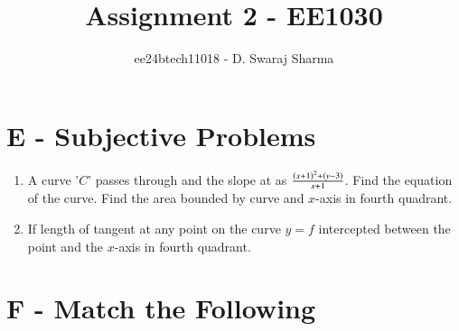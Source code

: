 \documentclass[journal]{IEEEtran}
\begin{document}

\vspace{3cm}

\title{Assignment 2 - EE1030}
\author{ee24btech11018 - D. Swaraj Sharma}

{\let\newpage\relax\maketitle}

\renewcommand{\thefigure}{\theenumi}
\renewcommand{\thetable}{\theenumi}
\setlength{\intextsep}{10pt}

\renewcommand{\thetable}{\theenumi}

\section{E - Subjective Problems}

\begin{enumerate}[label={\arabic*.}]

	\item A curve '$C$' passes through  and the slope at  as $\frac{\left(x+1\right)^2+\left(y-3\right)}{x+1}$. Find the equation of the curve. Find the area bounded by curve and $x$-axis in fourth quadrant.  
		
		\hfill{}
	
\item If length of tangent at any point on the curve $y=f$ intercepted between the point and the $x$-axis in fourth quadrant. 
	\hfill{}

\end{enumerate}

\section{F - Match the Following}
\end{document}
